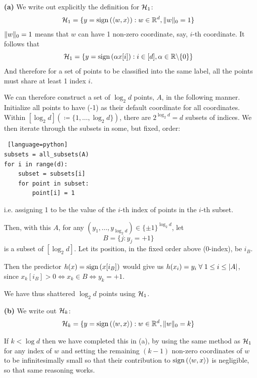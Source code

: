 \documentclass[a4paper, 12pt]{article}
\begin{document}
\begin{problem} [Problem 4]
\textbf{(a)} We write out explicitly the definition for $\mathcal{H}_1$:
\begin{equation*}
\mathcal{H}_1 = \{y = \mathrm{sign}\left(\langle w, x \rangle\right): w \in \mathbb{R}^d, \lVert w\rVert_0 = 1\}
\end{equation*}
$\lVert w\rVert_0 = 1$ means that $w$ can have 1 non-zero coordinate, say, $i$-th coordinate. It follows that \begin{equation*}
\mathcal{H}_1 = \{y = \mathrm{sign}\left(\alpha x[i]\right): i \in [d], \alpha \in \mathbb{R} \backslash \{0\}\}
\end{equation*}
And therefore for a set of points to be classified into the same label, all the points must share at least 1 index $i$.

We can therefore construct a set of $\log_2 d$ points, $A$, in the following manner. Initialize all points to have (-1) as their default coordinate for all coordinates. Within $[\log_2 d] (\coloneqq \{1, \ldots, \log_2 d\})$, there are $2^{\log_2 d} = d$ subsets of indices. We then iterate through the subsets in some, but fixed, order:
\begin{lstlisting} [language=python]
subsets = all_subsets(A)
for i in range(d):
    subset = subsets[i]
    for point in subset:
        point[i] = 1
\end{lstlisting}
i.e. assigning 1 to be the value of the $i$-th index of points in the $i$-th subset.

Then, with this $A$, for any $(y_1, \ldots, y_{\log_2 d}) \in \{\pm 1\}^{\log_2 d}$, let \begin{equation*}
B = \{ j : y_j = +1\}
\end{equation*}
is a subset of $[\log_2 d]$. Let its position, in the fixed order above (0-index), be $i_B$.

Then the predictor $h(x) = \mathrm{sign}\left(x[i_B]\right)$ would give us $h(x_i) = y_i \forall 1 \leq i \leq \abs{A}$, since $x_k[i_B] > 0 \Leftrightarrow x_k \in B \Leftrightarrow y_k = +1$. 

We have thus shattered $\log_2 d$ points using $\mathcal{H}_1$.

\textbf{(b)}
We write out $\mathcal{H}_k$:
\begin{equation*}
\mathcal{H}_k = \{y = \mathrm{sign}\left(\langle w, x \rangle\right) : w \in \mathbb{R}^d, \lVert w\rVert_0 = k\}
\end{equation*}

If $k < \log d$ then we have completed this in (a), by using the same method as $\mathcal{H}_1$ for any index of $w$ and setting the remaining $(k-1)$ non-zero coordinates of $w$ to be infinitesimally small so that their contribution to $\mathrm{sign}\left(\langle w, x \rangle\right)$ is negligible, so that same reasoning works.


\end{problem}
\end{document}

